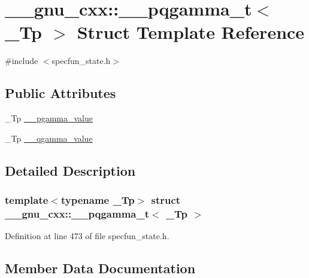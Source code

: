 \hypertarget{struct____gnu__cxx_1_1____pqgamma__t}{}\section{\+\_\+\+\_\+gnu\+\_\+cxx\+:\+:\+\_\+\+\_\+pqgamma\+\_\+t$<$ \+\_\+\+Tp $>$ Struct Template Reference}
\label{struct____gnu__cxx_1_1____pqgamma__t}


{\ttfamily \#include $<$specfun\+\_\+state.\+h$>$}

\subsection*{Public Attributes}
\begin{DoxyCompactItemize}
\item 
\+\_\+\+Tp \hyperlink{struct____gnu__cxx_1_1____pqgamma__t_aa12fa3fb5718738b5cb10fb1ac0eee46}{\+\_\+\+\_\+pgamma\+\_\+value}
\item 
\+\_\+\+Tp \hyperlink{struct____gnu__cxx_1_1____pqgamma__t_ab053b01578e22ba923ca2a4007b1f0a7}{\+\_\+\+\_\+qgamma\+\_\+value}
\end{DoxyCompactItemize}


\subsection{Detailed Description}
\subsubsection*{template$<$typename \+\_\+\+Tp$>$\newline
struct \+\_\+\+\_\+gnu\+\_\+cxx\+::\+\_\+\+\_\+pqgamma\+\_\+t$<$ \+\_\+\+Tp $>$}



Definition at line 473 of file specfun\+\_\+state.\+h.



\subsection{Member Data Documentation}
\mbox{\label{struct____gnu__cxx_1_1____pqgamma__t_aa12fa3fb5718738b5cb10fb1ac0eee46}} 
